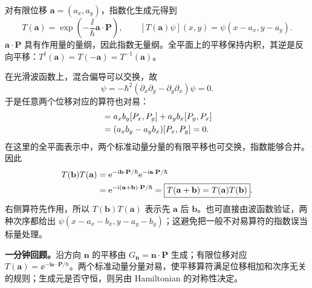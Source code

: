 对有限位移 $\mathbf a=(a_x,a_y)$，指数化生成元得到
\begin{equation}
  \boxed{T(\mathbf a)=\exp\!\left(-\frac{\ii}{\hbar}\mathbf a\cdot\mathbf P\right)},
  \qquad [T(\mathbf a)\psi](x,y)=\psi(x-a_x,y-a_y).
  \label{eq:QM-C12-S01-finite-translation}
\end{equation}
$\mathbf a\cdot\mathbf P$ 具有作用量的量纲，因此指数无量纲。全平面上的平移保持内积，其逆是反向平移：$T^\dagger(\mathbf a)=T(-\mathbf a)=T^{-1}(\mathbf a)$。


在光滑波函数上，混合偏导可以交换，故
\begin{equation}
  [P_x,P_y]\psi
  =-\hbar^2(\partial_x\partial_y-\partial_y\partial_x)\psi=0.
\end{equation}
于是任意两个位移对应的算符也对易：
\begin{align}
  [\mathbf a\cdot\mathbf P,\mathbf b\cdot\mathbf P]
  &=a_xb_y[P_x,P_y]+a_yb_x[P_y,P_x]\notag\\
  &=(a_xb_y-a_yb_x)[P_x,P_y]=0.
\end{align}
在这里的全平面表示中，两个标准动量分量的有限平移也可交换，指数能够合并。因此
\begin{align}
  T(\mathbf b)T(\mathbf a)
  &=\mathrm{e}^{-\mathrm{i}\mathbf b\cdot\mathbf P/\hbar}
    \mathrm{e}^{-\mathrm{i}\mathbf a\cdot\mathbf P/\hbar}\notag\\
  &=\mathrm{e}^{-\mathrm{i}(\mathbf a+\mathbf b)\cdot\mathbf P/\hbar}
   =\boxed{T(\mathbf a+\mathbf b)=T(\mathbf a)T(\mathbf b)}.
  \label{eq:QM-C12-S01-composition}
\end{align}
右侧算符先作用，所以 $T(\mathbf b)T(\mathbf a)$ 表示先 $\mathbf a$ 后 $\mathbf b$。也可直接由波函数验证，两种次序都给出 $\psi(x-a_x-b_x,y-a_y-b_y)$；这避免把一般不对易算符的指数误当标量处理。


\textbf{一分钟回顾。}沿方向 $\mathbf n$ 的平移由 $G_{\mathbf n}=\mathbf n\cdot\mathbf P$ 生成；有限位移对应 $T(\mathbf a)=\ee^{-\ii\mathbf a\cdot\mathbf P/\hbar}$。两个标准动量分量对易，使平移算符满足位移相加和次序无关的规则；生成元是否守恒，则另由 Hamiltonian 的对称性决定。

